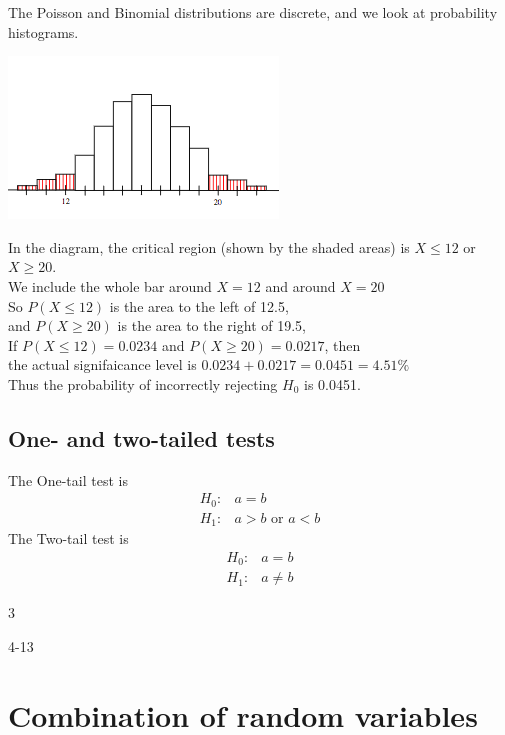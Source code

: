 \documentclass[a4paper]{article}
\begin{document}
The Poisson and Binomial distributions are
discrete, and we look at probability histograms.

\begin{center}
	\includegraphics[scale=0.5]{img_S/15_intro2}
\end{center}

In the diagram, the critical region (shown by the
shaded areas) is $X\leq 12$ or $X\geq 20$.\\

We include the whole bar around $X=12$ and around $X=20$\\

So $P(X\leq 12)$ is the area to the left of 12.5,\\
and $P(X\geq 20)$ is the area to the right of 19.5,\\

If $P(X\leq 12)=0.0234$ and $P(X\geq 20)=0.0217$, then \\
the actual signifaicance level is $0.0234+0.0217=0.0451=4.51\%$ \\
Thus the probability of incorrectly rejecting $H_0$ is 0.0451.
\subsection{One- and two-tailed tests}
The One-tail test is
\begin{align*}
	H_0: & a=b                 \\
	H_1: & a>b \mbox{~or~} a<b
\end{align*}
The Two-tail test is
\begin{align*}
	H_0: & a=b     \\
	H_1: & a\neq b
\end{align*}
\begin{eg}
	3
\end{eg}

\begin{eg}
	4-13
\end{eg}

\section{Combination of random variables}
\end{document}
